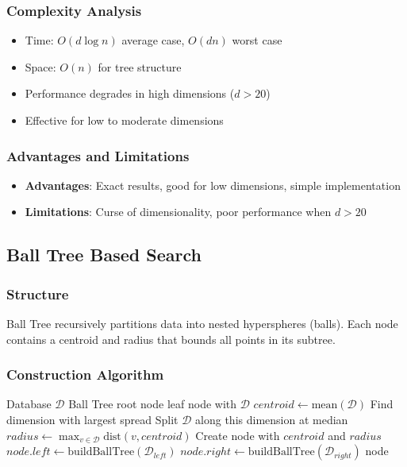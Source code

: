 \documentclass[12pt,a4paper]{article}
\begin{document}
\subsubsection{Complexity Analysis}
\begin{itemize}
    \item Time: $O(d \log n)$ average case, $O(dn)$ worst case
    \item Space: $O(n)$ for tree structure
    \item Performance degrades in high dimensions ($d > 20$)
    \item Effective for low to moderate dimensions
\end{itemize}

\subsubsection{Advantages and Limitations}
\begin{itemize}
    \item \textbf{Advantages}: Exact results, good for low dimensions, simple implementation
    \item \textbf{Limitations}: Curse of dimensionality, poor performance when $d > 20$
\end{itemize}

\subsection{Ball Tree Based Search}

\subsubsection{Structure}
Ball Tree recursively partitions data into nested hyperspheres (balls). Each node contains a centroid and radius that bounds all points in its subtree.

\subsubsection{Construction Algorithm}
\begin{algorithm}
\caption{Build Ball Tree}
\begin{algorithmic}[1]
\Require Database $\mathcal{D}$
\Ensure Ball Tree root node
    \State \Return leaf node with $\mathcal{D}$
\EndIf
\State $centroid \gets \text{mean}(\mathcal{D})$
\State Find dimension with largest spread
\State Split $\mathcal{D}$ along this dimension at median
\State $radius \gets \max_{v \in \mathcal{D}} \text{dist}(v, centroid)$
\State Create node with $centroid$ and $radius$
\State $node.left \gets \text{buildBallTree}(\mathcal{D}_{left})$
\State $node.right \gets \text{buildBallTree}(\mathcal{D}_{right})$
\State \Return node
\end{algorithmic}
\end{algorithm}
\end{document}
